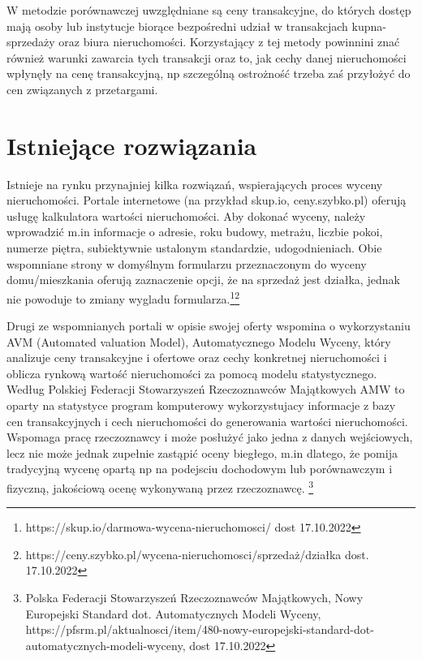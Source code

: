 \documentclass[a4paper,12pt,twoside,openany]{report}
\begin{document}
W metodzie porównawczej uwzględniane są ceny transakcyjne, do których dostęp mają osoby lub instytucje biorące bezpośredni udział w transakcjach kupna-sprzedaży oraz biura nieruchomości. Korzystający z tej metody powinnini znać również warunki zawarcia tych transakcji  oraz to, jak cechy danej nieruchomości wpłynęły na cenę transakcyjną, np szczególną ostrożność trzeba zaś przyłożyć do cen związanych z przetargami.\\


\section {Istniejące rozwiązania}
Istnieje na rynku przynajniej kilka rozwiązań, wspierających proces wyceny nieruchomości.
Portale internetowe (na przykład skup.io, ceny.szybko.pl) oferują usługę kalkulatora wartości nieruchomości. Aby dokonać wyceny, należy wprowadzić m.in informacje o adresie, roku budowy, metrażu, liczbie pokoi, numerze piętra, subiektywnie ustalonym standardzie, udogodnieniach. Obie wspomniane strony w domyślnym formularzu przeznaczonym do wyceny domu/mieszkania oferują zaznaczenie opcji, że na sprzedaż jest działka, jednak nie powoduje to zmiany wygladu formularza.\footnote{https://skup.io/darmowa-wycena-nieruchomosci/ dost 17.10.2022}\footnote{https://ceny.szybko.pl/wycena-nieruchomosci/sprzedaż/działka dost. 17.10.2022}

Drugi ze wspomnianych portali w opisie swojej oferty wspomina o wykorzystaniu AVM (Automated valuation Model), Automatycznego Modelu Wyceny, który analizuje ceny transakcyjne i ofertowe oraz cechy konkretnej nieruchomości i oblicza rynkową wartość nieruchomości za pomocą modelu statystycznego.\\
Według Polskiej Federacji Stowarzyszeń Rzeczoznawców Majątkowych AMW to oparty na statystyce program komputerowy wykorzystujacy informacje z bazy cen transakcyjnych i cech nieruchomości do generowania wartości nieruchomości. Wspomaga pracę rzeczoznawcy i może posłużyć jako jedna z danych wejściowych, lecz nie może jednak zupełnie zastąpić oceny biegłego, m.in dlatego, że pomija tradycyjną wycenę opartą np na podejsciu dochodowym lub porównawczym i fizyczną, jakościową ocenę wykonywaną przez rzeczoznawcę. \footnote{Polska Federacji Stowarzyszeń Rzeczoznawców Majątkowych, Nowy Europejski Standard dot. Automatycznych Modeli Wyceny, https://pfsrm.pl/aktualnosci/item/480-nowy-europejski-standard-dot-automatycznych-modeli-wyceny, dost 17.10.2022}
\end{document}
